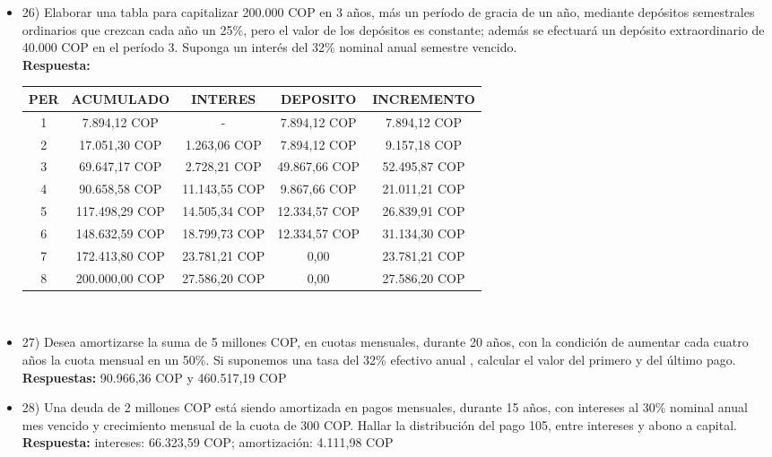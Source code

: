 \begin{itemize}
 \item 26)	 Elaborar una tabla para capitalizar 200.000 COP en 3 años, más un período de gracia de un año, mediante depósitos semestrales ordinarios que crezcan cada año un 25\%, pero el valor de los depósitos es constante; además se efectuará un depósito extraordinario de 40.000 COP en el período 3. Suponga un interés del 32\% nominal anual semestre vencido.\\
 \textbf{Respuesta:}\\
       \begin{center}
        \begin{tabular}{| c | c | c | c | c |}\hline
           \textbf{PER} & \textbf{ACUMULADO} & \textbf{INTERES} & \textbf{DEPOSITO} & \textbf{INCREMENTO}  \\ \hline
        1 & 7.894,12 COP & - & 7.894,12 COP & 7.894,12 COP \\ \hline
        2 & 17.051,30 COP & 1.263,06 COP & 7.894,12 COP & 9.157,18 COP \\ \hline
        3 & 69.647,17 COP & 2.728,21 COP & 49.867,66 COP & 52.495,87 COP \\ \hline
        4 & 90.658,58 COP & 11.143,55 COP & 9.867,66 COP & 21.011,21 COP \\ \hline
        5 & 117.498,29 COP & 14.505,34 COP & 12.334,57 COP & 26.839,91 COP \\ \hline
        6 & 148.632,59 COP & 18.799,73 COP & 12.334,57 COP & 31.134,30 COP \\ \hline
        7 & 172.413,80 COP & 23.781,21 COP & 0,00 & 23.781,21 COP \\ \hline
        8 & 200.000,00 COP & 27.586,20 COP & 0,00 & 27.586,20 COP \\ \hline
        \end{tabular}\\
        \end{center}

 \item 27)	 Desea amortizarse la suma de 5 millones COP, en cuotas mensuales, durante 20 años, con la condición de aumentar cada cuatro años la cuota mensual en un 50\%. Si suponemos una tasa del 32\% efectivo anual , calcular el valor del primero y del último pago. \\
       \textbf{Respuestas:} 90.966,36 COP y 460.517,19 COP
       \medskip

 \item 28)	 Una deuda de 2 millones COP está siendo amortizada en pagos mensuales, durante 15 años, con intereses al 30\% nominal anual mes vencido y crecimiento mensual de la cuota de 300 COP. Hallar la distribución del pago 105, entre intereses y abono a capital.\\
       \textbf{Respuesta:} intereses: 66.323,59 COP; amortización: 4.111,98 COP
       \medskip


\end{itemize}
